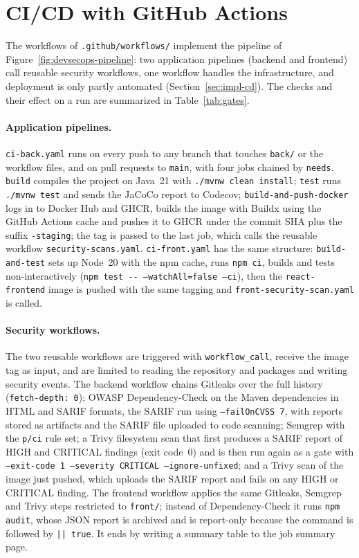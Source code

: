 \section{CI/CD with GitHub Actions}
\label{sec:impl-cicd}

The workflows of \texttt{.github/workflows/} implement the pipeline of Figure~\ref{fig:devsecops-pipeline}: two application pipelines (backend and frontend) call reusable security workflows, one workflow handles the infrastructure, and deployment is only partly automated (Section~\ref{sec:impl-cd}). The checks and their effect on a run are summarized in Table~\ref{tab:gates}.

\paragraph{Application pipelines.} \texttt{ci-back.yaml} runs on every push to any branch that touches \texttt{back/} or the workflow files, and on pull requests to \texttt{main}, with four jobs chained by \texttt{needs}. \texttt{build} compiles the project on Java~21 with \texttt{./mvnw clean install}; \texttt{test} runs \texttt{./mvnw test} and sends the JaCoCo report to Codecov; \texttt{build-and-push-docker} logs in to Docker Hub and GHCR, builds the image with Buildx using the GitHub Actions cache and pushes it to GHCR under the commit SHA plus the suffix \texttt{-staging}; the tag is passed to the last job, which calls the reusable workflow \texttt{security-scans.yaml}. \texttt{ci-front.yaml} has the same structure: \texttt{build-and-test} sets up Node~20 with the npm cache, runs \texttt{npm ci}, builds and tests non-interactively (\texttt{npm test -{}- --watchAll=false --ci}), then the \texttt{react-frontend} image is pushed with the same tagging and \texttt{front-security-scan.yaml} is called.

\paragraph{Security workflows.} The two reusable workflows are triggered with \texttt{workflow\_call}, receive the image tag as input, and are limited to reading the repository and packages and writing security events. The backend workflow chains Gitleaks over the full history (\texttt{fetch-depth: 0}); OWASP Dependency-Check on the Maven dependencies in HTML and SARIF formats, the SARIF run using \texttt{--failOnCVSS 7}, with reports stored as artifacts and the SARIF file uploaded to code scanning; Semgrep with the \texttt{p/ci} rule set; a Trivy filesystem scan that first produces a SARIF report of HIGH and CRITICAL findings (exit code~0) and is then run again as a gate with \texttt{--exit-code 1 --severity CRITICAL --ignore-unfixed}; and a Trivy scan of the image just pushed, which uploads the SARIF report and fails on any HIGH or CRITICAL finding. The frontend workflow applies the same Gitleaks, Semgrep and Trivy steps restricted to \texttt{front/}; instead of Dependency-Check it runs \texttt{npm audit}, whose JSON report is archived and is report-only because the command is followed by \texttt{|| true}. It ends by writing a summary table to the job summary page.

